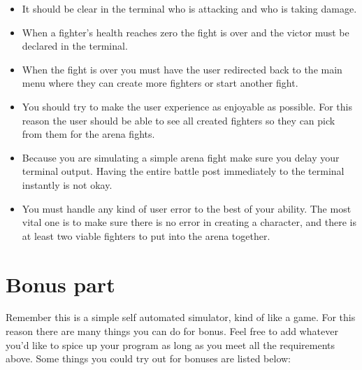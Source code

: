 \documentclass{42-en}
\begin{document}
\begin{itemize}
		\item It should be clear in the terminal who is attacking and who
		is taking damage.
		\item When a fighter's health reaches zero the fight is over and the victor	must be declared in the terminal.
		\item When the fight is over you must have the user redirected back
		to the main menu where they can create more fighters or start another fight.


		\item You should try to make the user experience as enjoyable as
		possible. For this reason the user should be able to see all created
		fighters so they can pick from them for the arena fights.
		\item Because you are simulating a simple arena fight make sure
		you delay your terminal output. Having the entire battle post
		immediately to the terminal instantly is not okay.
		\item You must handle any kind of user error to the best of your
		ability. The most vital one is to make sure there is no error in
		creating a character, and there is at least two viable fighters
		to put into the arena together.
		
	\end{itemize}

\chapter{Bonus part}
	
	Remember this is a simple self automated simulator, kind of like a game.
	For this reason there are many things you can do for bonus. Feel
	free to add whatever you'd like to spice up your program as long as
	you meet all the requirements above. Some things you could try out
	for bonuses are listed below:
\end{document}
